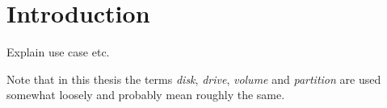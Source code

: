 \section{Introduction}
Explain use case etc.

Note that in this thesis the terms \emph{disk}, \emph{drive}, \emph{volume} and \emph{partition} are used somewhat loosely and probably mean roughly the same.